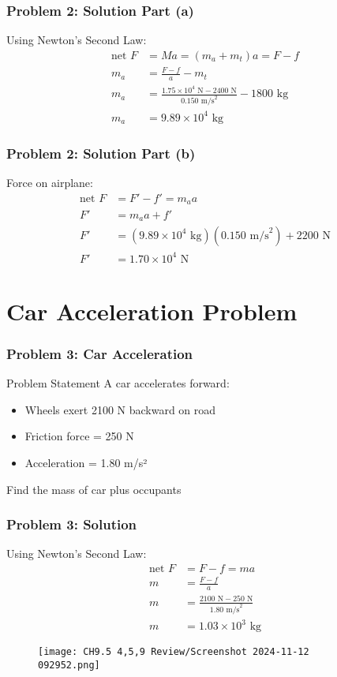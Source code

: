 \documentclass{beamer}
\begin{document}
\begin{frame}
\frametitle{Problem 2: Solution Part (a)}
Using Newton's Second Law:
\begin{align*}
\text{net }F &= Ma = (m_a + m_t)a = F - f\\
m_a &= \frac{F-f}{a} - m_t\\
m_a &= \frac{1.75 \times 10^4\text{ N} - 2400\text{ N}}{0.150\text{ m/s}^2} - 1800\text{ kg}\\
m_a &= 9.89 \times 10^4\text{ kg}
\end{align*}
\end{frame}

\begin{frame}
\frametitle{Problem 2: Solution Part (b)}
Force on airplane:
\begin{align*}
\text{net }F &= F' - f' = m_aa\\
F' &= m_aa + f'\\
F' &= (9.89 \times 10^4\text{ kg})(0.150\text{ m/s}^2) + 2200\text{ N}\\
F' &= 1.70 \times 10^4\text{ N}
\end{align*}\end{frame}



\section{Car Acceleration Problem}

\begin{frame}
\frametitle{Problem 3: Car Acceleration}
\begin{block}{Problem Statement}
A car accelerates forward:
\begin{itemize}
    \item Wheels exert 2100 N backward on road
    \item Friction force = 250 N
    \item Acceleration = 1.80 m/s²
\end{itemize}
Find the mass of car plus occupants
\end{block}
\end{frame}

\begin{frame}
\frametitle{Problem 3: Solution}
Using Newton's Second Law:
\begin{align*}
\text{net }F &= F - f = ma\\
m &= \frac{F-f}{a}\\
m &= \frac{2100\text{ N} - 250\text{ N}}{1.80\text{ m/s}^2}\\
m &= 1.03 \times 10^3\text{ kg}
\end{align*}
\begin{figure}[H]
    \centering
    \texttt{[image: CH9.5 4,5,9 Review/Screenshot 2024-11-12 092952.png]}
\end{figure}

\end{frame}
\end{document}
